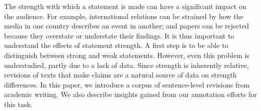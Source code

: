 The strength with which a statement is made can have a significant impact on the audience. For example, international relations can be strained by how the media in one country describes an event in another; and papers can be rejected because they overstate or understate their findings. It is thus important to understand the effects of statement strength. A first step is to be able to distinguish between strong and weak statements. However, even this problem is understudied, partly due to a lack of data. Since strength is inherently relative, revisions of texts that make claims are a natural source of data on strength differences. In this paper, we introduce a corpus of sentence-level revisions from academic writing. We also describe insights gained from our annotation efforts for this task.

